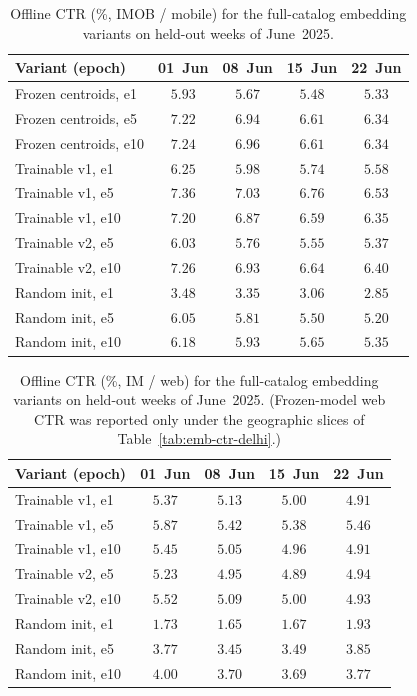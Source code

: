 \begin{table}[ht]
  \centering
  \caption{Offline CTR (\%, IMOB / mobile) for the full-catalog embedding
           variants on held-out weeks of June~2025.}
  \label{tab:emb-ctr-imob}
  \small
  \begin{tabular}{lcccc}
    \toprule
    Variant (epoch) & 01~Jun & 08~Jun & 15~Jun & 22~Jun \\
    \midrule
    Frozen centroids, e1   & $5.93$ & $5.67$ & $5.48$ & $5.33$ \\
    Frozen centroids, e5   & $7.22$ & $6.94$ & $6.61$ & $6.34$ \\
    Frozen centroids, e10  & $7.24$ & $6.96$ & $6.61$ & $6.34$ \\
    Trainable v1, e1       & $6.25$ & $5.98$ & $5.74$ & $5.58$ \\
    Trainable v1, e5       & $7.36$ & $7.03$ & $6.76$ & $6.53$ \\
    Trainable v1, e10      & $7.20$ & $6.87$ & $6.59$ & $6.35$ \\
    Trainable v2, e5       & $6.03$ & $5.76$ & $5.55$ & $5.37$ \\
    Trainable v2, e10      & $7.26$ & $6.93$ & $6.64$ & $6.40$ \\
    Random init, e1        & $3.48$ & $3.35$ & $3.06$ & $2.85$ \\
    Random init, e5        & $6.05$ & $5.81$ & $5.50$ & $5.20$ \\
    Random init, e10       & $6.18$ & $5.93$ & $5.65$ & $5.35$ \\
    \bottomrule
  \end{tabular}
\end{table}

\begin{table}[ht]
  \centering
  \caption{Offline CTR (\%, IM / web) for the full-catalog embedding variants on
           held-out weeks of June~2025. (Frozen-model web CTR was reported only
           under the geographic slices of Table~\ref{tab:emb-ctr-delhi}.)}
  \label{tab:emb-ctr-im}
  \small
  \begin{tabular}{lcccc}
    \toprule
    Variant (epoch) & 01~Jun & 08~Jun & 15~Jun & 22~Jun \\
    \midrule
    Trainable v1, e1   & $5.37$ & $5.13$ & $5.00$ & $4.91$ \\
    Trainable v1, e5   & $5.87$ & $5.42$ & $5.38$ & $5.46$ \\
    Trainable v1, e10  & $5.45$ & $5.05$ & $4.96$ & $4.91$ \\
    Trainable v2, e5   & $5.23$ & $4.95$ & $4.89$ & $4.94$ \\
    Trainable v2, e10  & $5.52$ & $5.09$ & $5.00$ & $4.93$ \\
    Random init, e1    & $1.73$ & $1.65$ & $1.67$ & $1.93$ \\
    Random init, e5    & $3.77$ & $3.45$ & $3.49$ & $3.85$ \\
    Random init, e10   & $4.00$ & $3.70$ & $3.69$ & $3.77$ \\
    \bottomrule
  \end{tabular}
\end{table}

